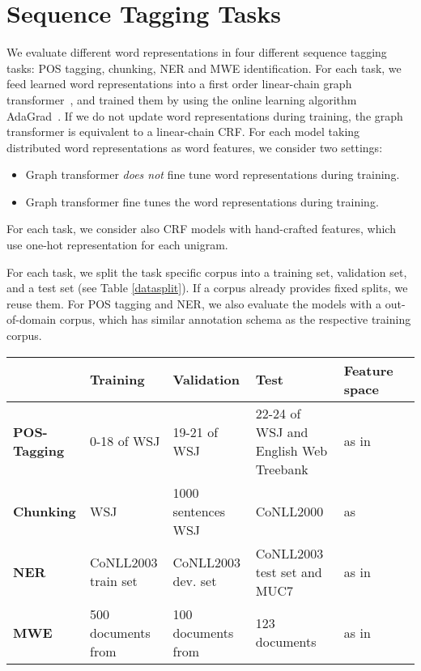 \section{Sequence Tagging Tasks}
\label{sec:SeqTagging}

We evaluate different word representations in four different sequence tagging tasks: POS tagging, chunking, NER and MWE identification. For each task, we feed learned word representations into a first order linear-chain graph transformer~\cite{collobert2011natural}, and trained them by using the online learning algorithm AdaGrad~\cite{duchi2011adaptive}. If we do not update word representations during training, the graph transformer is equivalent to a linear-chain CRF. For each model taking distributed word representations as word features, we consider two settings: 
\begin{small}
\begin{itemize}
\item[-] Graph transformer \textit{does not} fine tune word representations during training.
\item[-] Graph transformer fine tunes the word representations during training.
\end{itemize}
\end{small}
For each task, we consider also CRF models with hand-crafted features, which use one-hot representation for each unigram.

For each task, we split the task specific corpus into a training set, validation set, and a test set (see Table \ref{datasplit}). If a corpus already provides fixed splits, we reuse them. For POS tagging and NER, we also evaluate the models with a out-of-domain corpus, which has similar annotation schema as the respective training corpus.
\begin{table*}
\begin{small}
\begin{tabular}{llp{3cm}lll}
\hline
			& \textbf{Training} & \textbf{Validation} & \textbf{Test} & \textbf{Feature space} \\ \hline
\textbf{POS-Tagging} & 0-18 of WSJ & 19-21 of WSJ & 22-24 of WSJ and English Web Treebank & as in~\cite{collobert2011natural} \\
\textbf{Chunking} & WSJ & 1000 sentences WSJ & CoNLL2000 & as~\cite{turian2010word}\\
\textbf{NER} & CoNLL2003 train set & CoNLL2003 dev. set & CoNLL2003 test set and MUC7 & as in~\cite{turian2010word} \\
\textbf{MWE} & 500 documents from & 100 documents from & 123 documents & as in~\cite{mwecorpus}\\
\hline
\end{tabular}
\caption{Datasets and features for each task.}
\label{datasplit}
\end{small}
\end{table*}

